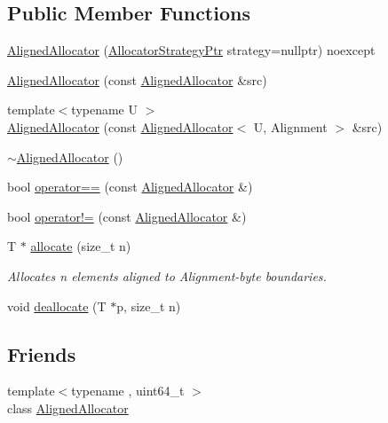 \subsection*{Public Member Functions}
\begin{DoxyCompactItemize}
\item 
\hyperlink{classintel_1_1hexl_1_1AlignedAllocator_afb7109e1c05fc55412ecfdc36894f7e5}{Aligned\+Allocator} (\hyperlink{namespaceintel_1_1hexl_aced64250965d3b78827d8009634eef0c}{Allocator\+Strategy\+Ptr} strategy=nullptr) noexcept
\item 
\hyperlink{classintel_1_1hexl_1_1AlignedAllocator_a93a20265cc1f7b25ccd5e7b2cc759b67}{Aligned\+Allocator} (const \hyperlink{classintel_1_1hexl_1_1AlignedAllocator}{Aligned\+Allocator} \&src)
\item 
{\footnotesize template$<$typename U $>$ }\\\hyperlink{classintel_1_1hexl_1_1AlignedAllocator_a7ef7928d5be819410959faf80f6746cc}{Aligned\+Allocator} (const \hyperlink{classintel_1_1hexl_1_1AlignedAllocator}{Aligned\+Allocator}$<$ U, Alignment $>$ \&src)
\item 
\hyperlink{classintel_1_1hexl_1_1AlignedAllocator_a6841e8cef5bedf494f47370062c73cbc}{$\sim$\+Aligned\+Allocator} ()
\item 
bool \hyperlink{classintel_1_1hexl_1_1AlignedAllocator_a6f8f9c34b0ddab249c945ddb6609c6dd}{operator==} (const \hyperlink{classintel_1_1hexl_1_1AlignedAllocator}{Aligned\+Allocator} \&)
\item 
bool \hyperlink{classintel_1_1hexl_1_1AlignedAllocator_a6b59d9d7304cda06b8c166dd865ff5db}{operator!=} (const \hyperlink{classintel_1_1hexl_1_1AlignedAllocator}{Aligned\+Allocator} \&)
\item 
T $\ast$ \hyperlink{classintel_1_1hexl_1_1AlignedAllocator_ac007b85746672b4e777aa9561b54f8a9}{allocate} (size\+\_\+t n)
\begin{DoxyCompactList}\small\item\em Allocates {\ttfamily n} elements aligned to Alignment-\/byte boundaries. \end{DoxyCompactList}\item 
void \hyperlink{classintel_1_1hexl_1_1AlignedAllocator_af370e3d86c582bcf1370656080bab1ec}{deallocate} (T $\ast$p, size\+\_\+t n)
\end{DoxyCompactItemize}
\subsection*{Friends}
\begin{DoxyCompactItemize}
\item 
{\footnotesize template$<$typename , uint64\+\_\+t $>$ }\\class \hyperlink{classintel_1_1hexl_1_1AlignedAllocator_aaded07599020ca35e89e078674263c63}{Aligned\+Allocator}
\end{DoxyCompactItemize}


